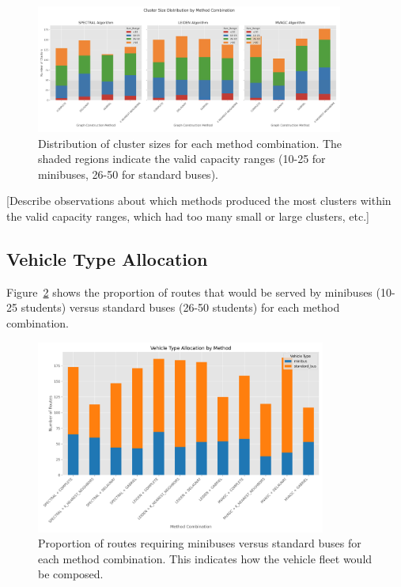 \begin{figure}[!htbp]
\centering
\includegraphics[width=0.9\textwidth]{img/cluster_distribution}
\caption{Distribution of cluster sizes for each method combination. The shaded regions indicate the valid capacity ranges (10-25 for minibuses, 26-50 for standard buses).}
\label{fig:cluster_distribution}
\end{figure}

[Describe observations about which methods produced the most clusters within the valid capacity ranges, which had too many small or large clusters, etc.]

\subsection{Vehicle Type Allocation}
\label{subsec:vehicle_allocation}

Figure~\ref{fig:vehicle_allocation} shows the proportion of routes that would be served by minibuses (10-25 students) versus standard buses (26-50 students) for each method combination.

\begin{figure}[!htbp]
\centering
\includegraphics[width=0.85\textwidth]{img/vehicle_allocation}
\caption{Proportion of routes requiring minibuses versus standard buses for each method combination. This indicates how the vehicle fleet would be composed.}
\label{fig:vehicle_allocation}
\end{figure}

